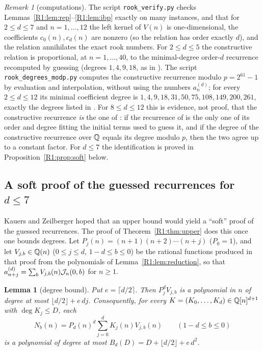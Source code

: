 \documentclass[11pt]{amsart}
\newtheorem{lemma}[theorem]{Lemma}
\theoremstyle{definition}
\theoremstyle{remark}
\newtheorem{remark}[theorem]{Remark}
\begin{document}
\begin{remark}[computations]\label{R1:rem:computations}
The script \texttt{rook\_\allowbreak{}verify.py} checks Lemmas~\ref{R1:lem:rep}--\ref{R1:lem:ibp} exactly
on many instances, and that for $2\le d\le7$ and $n=1,\dots,12$ the left kernel of $V(n)$ is
one-dimensional, the coefficients $c_0(n),c_d(n)$ are nonzero (so the relation has order
exactly $d$), and the relation annihilates the exact rook numbers. For $2\le d\le5$ the
constructive relation is proportional, at $n=1,\dots,40$, to the minimal-degree order-$d$
recurrence recomputed by guessing (degrees $1,4,9,18$, as in \cite[\S5]{R1-KZ}).
The script \texttt{rook\_\allowbreak{}degrees\_\allowbreak{}modp.py} computes the constructive recurrence modulo
$p=2^{61}-1$ by evaluation and interpolation, without using the numbers $a^{(d)}_n$; for
every $2\le d\le12$ its minimal coefficient degree is $1,4,9,18,31,50,75,108,149,200,261$,
exactly the degrees listed in \cite[\S5]{R1-KZ}. For $8\le d\le12$ this is evidence, not proof,
that the constructive
recurrence \emph{is} the one of \cite{R1-KZ}: if the recurrence of \cite{R1-KZ} is the only one
of its order and degree fitting the initial terms used to guess it, and if the degree of the
constructive recurrence over $\mathbb{Q}$ equals its degree modulo $p$, then the two agree up to a
constant factor. For $d\le7$ the identification is proved in
Proposition~\ref{R1:prop:soft} below.
\end{remark}

\subsection{A soft proof of the guessed recurrences for \texorpdfstring{$d\le7$}{d<=7}}\label{R1:sec:soft}

Kauers and Zeilberger hoped that an upper bound would yield a ``soft'' proof of the guessed
recurrences. The proof of Theorem~\ref{R1:thm:upper} does this once one bounds degrees. Let
$P_j(n)=(n+1)(n+2)\cdots(n+j)$ ($P_0=1$), and let $V_{j,b}\in\mathbb{Q}(n)$ ($0\le j\le d$,
$1-d\le b\le0$) be the rational functions produced in that proof from the polynomials of
Lemma~\ref{R1:lem:reduction}, so that $a^{(d)}_{n+j}=\sum_bV_{j,b}(n)\mathcal{J}_n(0,b)$ for $n\ge1$.

\begin{lemma}[degree bound]\label{R1:lem:degbound}
Put $e=\lceil d/2\rceil$. Then $P_j^dV_{j,b}$ is a polynomial in $n$ of degree at most
$\lfloor d/2\rfloor+e\,dj$. Consequently, for every $K=(K_0,\dots,K_d)\in\mathbb{Q}[n]^{d+1}$ with
$\deg K_j\le D$, each
\[
N_b(n)=P_d(n)^d\sum_{j=0}^{d}K_j(n)V_{j,b}(n)\qquad(1-d\le b\le0)
\]
is a polynomial of degree at most $B_d(D)=D+\lfloor d/2\rfloor+e\,d^2$.
\end{lemma}
\end{document}
